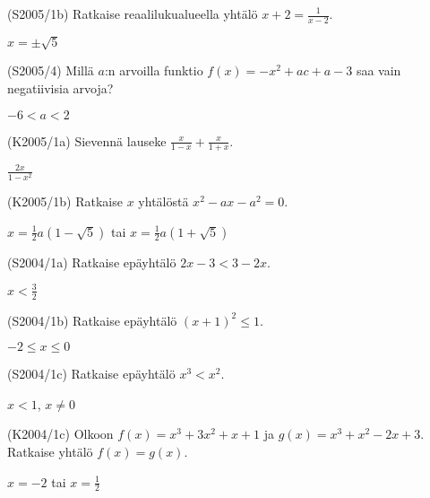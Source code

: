 \begin{multicols}{2}
\begin{tehtava}
(S2005/1b) Ratkaise reaalilukualueella yhtälö $x+2=\frac{1}{x-2}$.
\begin{vastaus}
$x=\pm \sqrt{5}$ 
\end{vastaus}
\end{tehtava}

\begin{tehtava}
(S2005/4) Millä $a$:n arvoilla funktio $f(x)=-x^2+ac+a-3$ saa vain negatiivisia arvoja?
\begin{vastaus}
$-6<a<2$ 
\end{vastaus}
\end{tehtava}

\begin{tehtava}
(K2005/1a) Sievennä lauseke $\frac{x}{1-x}+\frac{x}{1+x}$.
\begin{vastaus}
$\frac{2x}{1-x^2}$ 
\end{vastaus}
\end{tehtava}

\begin{tehtava}
(K2005/1b) Ratkaise $x$ yhtälöstä $x^2-ax-a^2=0$.
\begin{vastaus}
$x= \frac{1}{2}a(1-\sqrt{5})$ tai $x= \frac{1}{2}a(1+\sqrt{5})$ 
\end{vastaus}
\end{tehtava}

\begin{tehtava}
(S2004/1a) Ratkaise epäyhtälö $2x-3<3-2x$.
\begin{vastaus}
$x<\frac{3}{2}$ 
\end{vastaus}
\end{tehtava}

\begin{tehtava}
(S2004/1b) Ratkaise epäyhtälö $(x+1)^2 \leq 1$.
\begin{vastaus}
$-2 \leq x \leq 0$ 
\end{vastaus}
\end{tehtava}

\begin{tehtava}
(S2004/1c) Ratkaise epäyhtälö $x^3<x^2$.
\begin{vastaus}
$x<1$, $x\neq0$ 
\end{vastaus}
\end{tehtava}

\begin{tehtava}
(K2004/1c) Olkoon $f(x)=x^3+3x^2+x+1$ ja $g(x)=x^3+x^2-2x+3$. Ratkaise yhtälö $f(x)=g(x)$.
\begin{vastaus}
$x=-2$ tai $x=\frac{1}{2}$  
\end{vastaus}
\end{tehtava}


\end{multicols}

